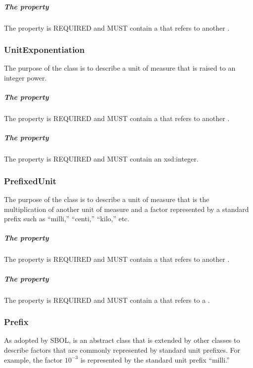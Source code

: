 \subparagraph{The  property}\label{sec:hasDenominator}
The  property is REQUIRED and MUST contain a  that refers to another .

\subsubsection{UnitExponentiation}
\label{sec:UnitExponentiation}

The purpose of the  class is to describe a unit of measure that is raised to an integer power.

\subparagraph{The  property}\label{sec:hasBase}
The  property is REQUIRED and MUST contain a  that refers to another .

\subparagraph{The  property}\label{sec:hasExponent}
The  property is REQUIRED and MUST contain an xsd:integer.

\subsubsection{PrefixedUnit}
\label{sec:PrefixedUnit}

The purpose of the  class is to describe a unit of measure that is the multiplication of another unit of measure and a factor represented by a standard prefix such as ``milli,'' ``centi,'' ``kilo,'' etc. 

\subparagraph{The  property}\label{sec:hasUnit:PrefixedUnit}
The  property is REQUIRED and MUST contain a  that refers to another . 

\subparagraph{The  property}\label{sec:hasPrefix}
The  property is REQUIRED and MUST contain a  that refers to a .

\subsubsection{Prefix}
\label{sec:Prefix}

As adopted by SBOL,  is an abstract class that is extended by other classes to describe factors that are commonly represented by standard unit prefixes. For example, the factor $10^{-3}$ is represented by the standard unit prefix ``milli.'' 

